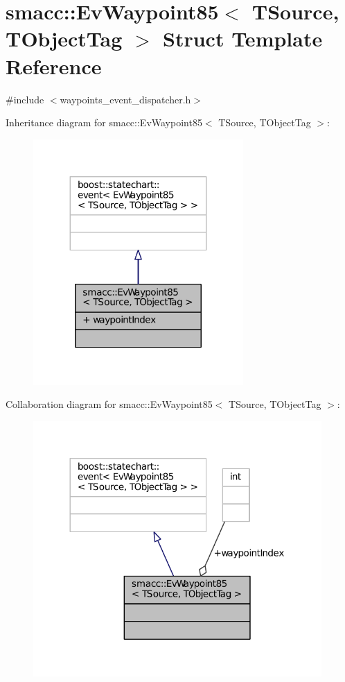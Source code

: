 \hypertarget{structsmacc_1_1EvWaypoint85}{}\section{smacc\+:\+:Ev\+Waypoint85$<$ T\+Source, T\+Object\+Tag $>$ Struct Template Reference}
\label{structsmacc_1_1EvWaypoint85}


{\ttfamily \#include $<$waypoints\+\_\+event\+\_\+dispatcher.\+h$>$}



Inheritance diagram for smacc\+:\+:Ev\+Waypoint85$<$ T\+Source, T\+Object\+Tag $>$\+:
\nopagebreak
\begin{figure}[H]
\begin{center}
\leavevmode
\includegraphics[width=227pt]{structsmacc_1_1EvWaypoint85__inherit__graph}
\end{center}
\end{figure}


Collaboration diagram for smacc\+:\+:Ev\+Waypoint85$<$ T\+Source, T\+Object\+Tag $>$\+:
\nopagebreak
\begin{figure}[H]
\begin{center}
\leavevmode
\includegraphics[width=312pt]{structsmacc_1_1EvWaypoint85__coll__graph}
\end{center}
\end{figure}
